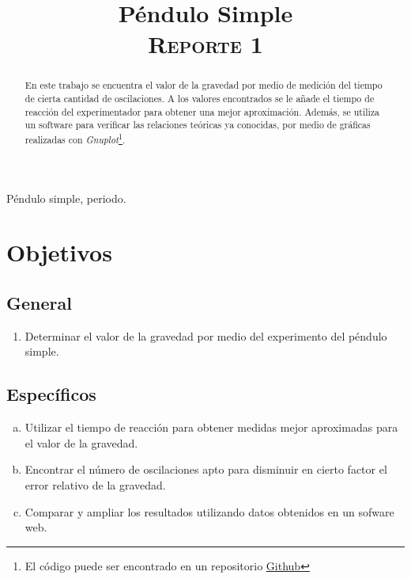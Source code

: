 \documentclass[conference]{IEEEtran}
\begin{document}
\title{Péndulo Simple\\
{\footnotesize \scshape{Reporte 1}}
}

\author{
}

\maketitle

\begin{abstract}
    En este trabajo se encuentra el valor de la gravedad por medio de medición del tiempo de cierta cantidad de oscilaciones. A los valores encontrados se le añade el tiempo de reacción del experimentador para obtener una mejor aproximación. Además, se utiliza un software para verificar las relaciones teóricas ya conocidas, por medio de gráficas realizadas con \textit{Gnuplot}\footnote{El código puede ser encontrado en un repositorio \href{https://github.com/DSarceno/Semestre5/tree/main/ReduccionDatos/Reporte1/graficas}{Github} }.
\end{abstract}

\begin{IEEEkeywords}
    Péndulo simple, periodo.
\end{IEEEkeywords}

\section{Objetivos}

\subsection{General}
    \begin{enumerate}[1.]
        \item Determinar el valor de la gravedad por medio del experimento del péndulo simple.
    \end{enumerate}
\subsection{Específicos}
    \begin{enumerate}[a)]
        \item Utilizar el tiempo de reacción para obtener medidas mejor aproximadas para el valor de la gravedad.
        \item Encontrar el número de oscilaciones apto para disminuir en cierto factor el error relativo de la gravedad.
        \item Comparar y ampliar los resultados utilizando datos obtenidos en un sofware web.
    \end{enumerate}
\end{document}

